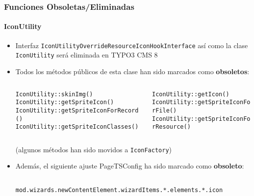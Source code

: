 \begin{frame}[fragile]
	\frametitle{Funciones Obsoletas/Eliminadas}
	\framesubtitle{IconUtility}


	\begin{itemize}

		\item Interfaz \texttt{IconUtilityOverrideResourceIconHookInterface}\newline
			así como la clase \texttt{IconUtility} será eliminada en TYPO3 CMS 8

		\item Todos los métodos públicos de esta clase han sido marcados como \textbf{obsoletos}:

		\vspace{0.2cm}

		\begin{columns}[T]
			\begin{column}{.5\textwidth}
				\tiny
					\tabto{1cm}\texttt{IconUtility::skinImg()}\newline
					\tabto{1cm}\texttt{IconUtility::getSpriteIcon()}\newline
					\tabto{1cm}\texttt{IconUtility::getSpriteIconForRecord()}\newline
					\tabto{1cm}\texttt{IconUtility::getSpriteIconClasses()}
			\end{column}
			\begin{column}{.5\textwidth}
				\vspace{-0.18cm}\tiny
					\texttt{IconUtility::getIcon()}\newline
					\texttt{IconUtility::getSpriteIconForFile()}\newline
					\texttt{IconUtility::getSpriteIconForResource()}\newline
			\end{column}
		\end{columns}

		\vspace{0.2cm}
		\normalsize

			\small
				(algunos métodos han sido movidos a \texttt{IconFactory})
			\normalsize

		\item Además, el siguiente ajuste PageTSConfig ha sido marcado como \textbf{obsoleto}:

			\begin{lstlisting}
				mod.wizards.newContentElement.wizardItems.*.elements.*.icon
			\end{lstlisting}

	\end{itemize}

\end{frame}

